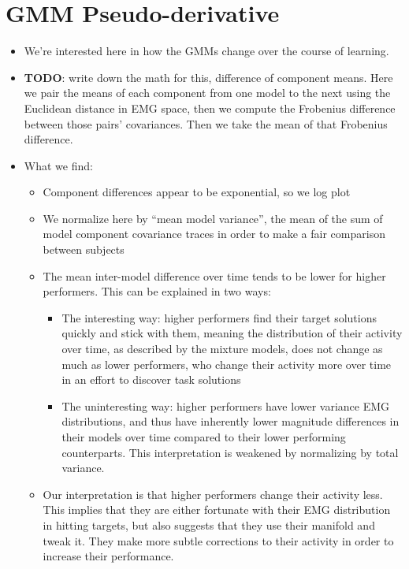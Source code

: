 \documentclass[../main.tex]{subfiles}
\begin{document}
\section{GMM Pseudo-derivative}


\begin{itemize}
  \setlength\itemsep{0em}
  \item We're interested here in how the GMMs change over the course of learning.
  \item \textbf{TODO}: write down the math for this, difference of component means. Here we pair the means of each component from one model to the next using the Euclidean distance in EMG space, then we compute the Frobenius difference between those pairs' covariances. Then we take the mean of that Frobenius difference.
  \item What we find: 
  \begin{itemize}
    \item Component differences appear to be exponential, so we log plot
    \item We normalize here by ``mean model variance'', the mean of the sum of model component covariance traces in order to make a fair comparison between subjects
    \item The mean inter-model difference over time tends to be lower for higher performers. This can be explained in two ways:
    \begin{itemize}
      \item The interesting way: higher performers find their target solutions quickly and stick with them, meaning the distribution of their activity over time, as described by the mixture models, does not change as much as lower performers, who change their activity more over time in an effort to discover task solutions
      \item The uninteresting way: higher performers have lower variance EMG distributions, and thus have inherently lower magnitude differences in their models over time compared to their lower performing counterparts. This interpretation is weakened by normalizing by total variance.
    \end{itemize}
    \item Our interpretation is that higher performers change their activity less. This implies that they are either fortunate with their EMG distribution in hitting targets, but also suggests that they use their manifold and tweak it. They make more subtle corrections to their activity in order to increase their performance.
  \end{itemize}

\end{itemize}
\end{document}
